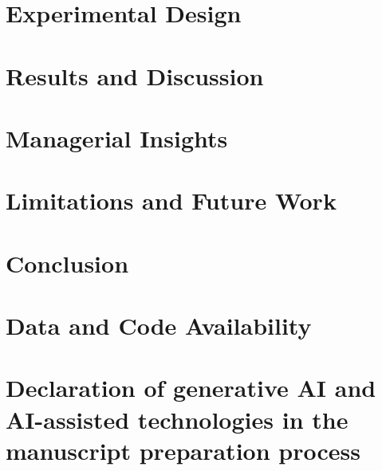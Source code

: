 \documentclass[review,12pt,authoryear]{elsarticle}
\begin{document}
\section{Experimental Design}


\section{Results and Discussion}


\section{Managerial Insights}


\section{Limitations and Future Work}


\section{Conclusion}


\section*{Data and Code Availability}


\section*{Declaration of generative AI and AI-assisted technologies in the manuscript preparation process}




\end{document}
